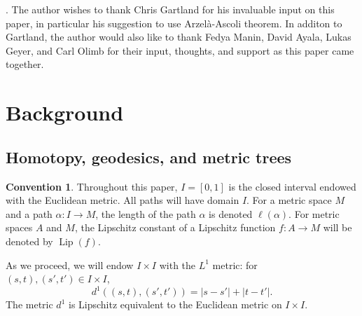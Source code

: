 \documentclass{article}
\theoremstyle{definition}
\newtheorem{convention}[theorem]{Convention}
\theoremstyle{remark}
\newcommand{\dcc}[1]{d_{CC}^{#1}}
\newcommand{\pilip}[1]{\pi_{#1}^{\text{Lip}}}
\newcommand{\length}[1]{\ell}%
\DeclareMathOperator{\Lip}{Lip}
\begin{document}
\medskip
{}. The author wishes to thank Chris Gartland for his invaluable input on this paper, in particular his suggestion to use Arzel\`{a}-Ascoli theorem. In additon to Gartland, the author would also like to thank Fedya Manin, David Ayala, Lukas Geyer, and Carl Olimb for their input, thoughts, and support as this paper came together.








\section{Background}


\subsection{Homotopy, geodesics, and metric trees}

\begin{convention}
Throughout this paper, $I=[0,1]$ is the closed interval endowed with the Euclidean metric. All paths will have domain $I$. For a metric space $M$ and a path $\alpha:I\rightarrow M$, the length of the path $\alpha$ is denoted $\length{M}(\alpha)$.  For metric spaces $A$ and $M$, the Lipschitz constant of a Lipschitz function $f:A\rightarrow M$ will be denoted by $\Lip(f)$. 
\end{convention}

As we proceed, we will endow $I\times I$ with the $L^1$ metric: for $(s,t),(s',t')\in I\times I$,
\[
d^1((s,t),(s',t'))=|s-s'|+|t-t'|.
\]
The metric $d^1$ is Lipschitz equivalent to the Euclidean metric on $I\times I$.
\end{document}

